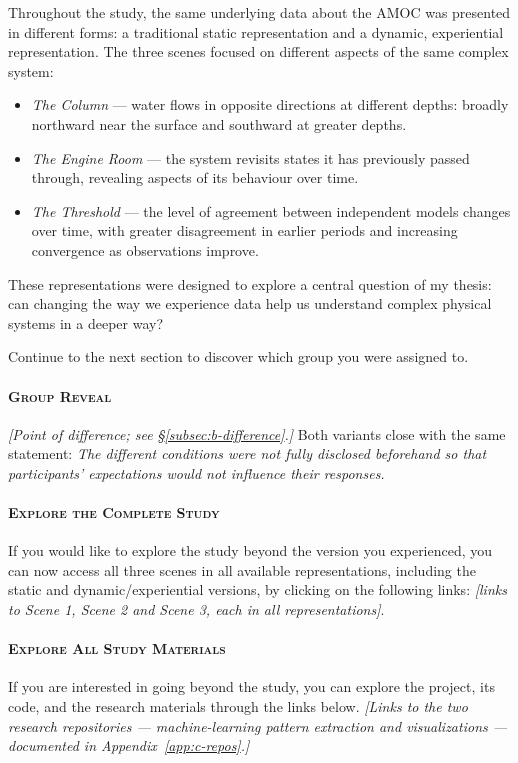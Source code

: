 Throughout the study, the same underlying data about the AMOC was presented in different
forms: a traditional static representation and a dynamic, experiential representation. The
three scenes focused on different aspects of the same complex system:

\begin{itemize}[leftmargin=2em, itemsep=2pt]
\item \emph{The Column} --- water flows in opposite directions at different depths: broadly
      northward near the surface and southward at greater depths.
\item \emph{The Engine Room} --- the system revisits states it has previously passed through,
      revealing aspects of its behaviour over time.
\item \emph{The Threshold} --- the level of agreement between independent models changes over
      time, with greater disagreement in earlier periods and increasing convergence as
      observations improve.
\end{itemize}

These representations were designed to explore a central question of my thesis: can changing
the way we experience data help us understand complex physical systems in a deeper way?

Continue to the next section to discover which group you were assigned to.

\paragraph{\textsc{Group Reveal}}
\emph{[Point of difference; see \S\ref{subsec:b-difference}.]} Both variants close with the
same statement: \emph{The different conditions were not fully disclosed beforehand so that
participants' expectations would not influence their responses.}

\paragraph{\textsc{Explore the Complete Study}}
If you would like to explore the study beyond the version you experienced, you can now access
all three scenes in all available representations, including the static and
dynamic/experiential versions, by clicking on the following links: \emph{[links to Scene 1,
Scene 2 and Scene 3, each in all representations]}.

\paragraph{\textsc{Explore All Study Materials}}
If you are interested in going beyond the study, you can explore the project, its code, and the
research materials through the links below. \emph{[Links to the two research repositories ---
machine-learning pattern extraction and visualizations --- documented in
Appendix~\ref{app:c-repos}.]}

